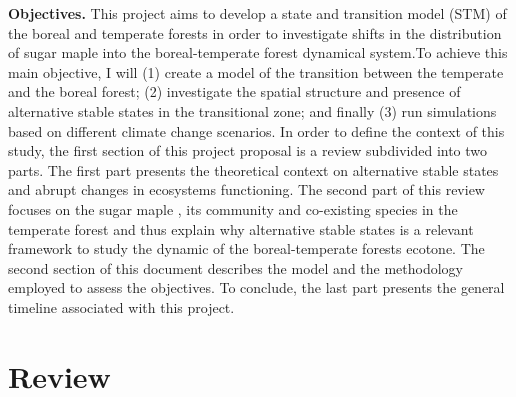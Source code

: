 \textbf{Objectives.} This project aims to develop a state and transition model
(STM) of the boreal and temperate forests in order to investigate shifts in the
distribution of sugar maple into the boreal-temperate forest dynamical
system.To achieve this main objective, I will (1) create a  model of the
transition between the temperate and the boreal forest; (2) investigate the
spatial structure and presence of alternative stable states in the transitional
zone; and finally (3) run simulations based on different climate change
scenarios.  In order to define the context of this study, the first section of
this project proposal is a review subdivided into two parts. The first part
presents the theoretical context on alternative stable states and abrupt changes
in ecosystems functioning. The second part of this review focuses on the sugar
maple , its community and co-existing species in the temperate forest and thus
explain why alternative stable states is a relevant framework to study the
dynamic of the boreal-temperate forests ecotone.  The second section of this
document describes the model and the methodology employed to assess the
objectives. To conclude, the last part presents the general timeline associated
with this project.


\section{Review} 

